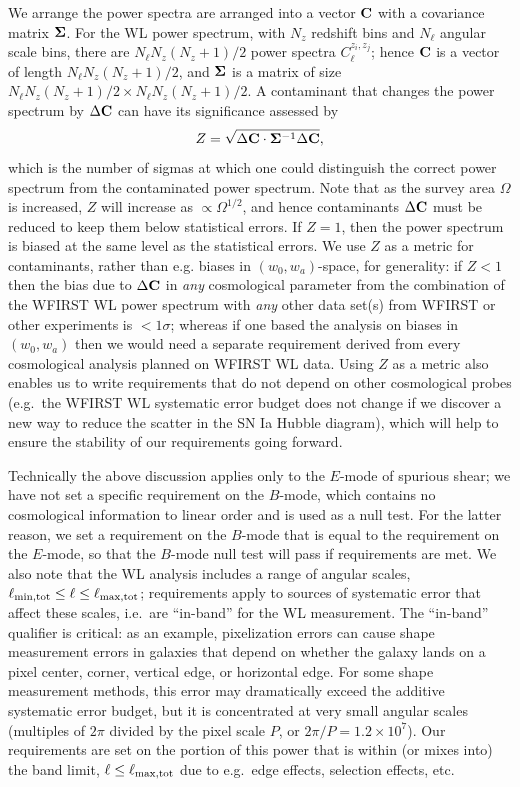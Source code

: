 \documentclass[aps,prd, amsmath,amssymb,superscriptaddress,showkeys,nofootinbib,reprint,preprintnumbers]{revtex4-1}
\begin{document}
We arrange the power spectra are arranged into a vector ${\bf C}$ with
a covariance matrix ${\bf\Sigma}$. For the WL power spectrum, with
$N_z$ redshift bins and $N_\ell$ angular scale bins, there are $N_\ell
N_z(N_z+1)/2$ power spectra $C_\ell^{z_i,z_j}$; hence ${\bf C}$ is a
vector of length $N_\ell N_z(N_z+1)/2$, and ${\bf\Sigma}$ is a matrix
of size $N_\ell N_z(N_z+1)/2 \times N_\ell N_z(N_z+1)/2$. A
contaminant that changes the power spectrum by $\Delta {\bf C}$ can
have its significance assessed by
\begin{equation}
Z = \sqrt{\Delta{\bf C}\cdot{\bf\Sigma}^{-1}\Delta{\bf C}},
\label{eq:alpha}
\end{equation}
which is the number of sigmas at which one could distinguish the
correct power spectrum from the contaminated power spectrum. Note that
as the survey area $\Omega$ is increased, $Z$ will increase as
$\propto\Omega^{1/2}$, and hence contaminants $\Delta{\bf C}$ must be
reduced to keep them below statistical errors. If $Z=1$, then the
power spectrum is biased at the same level as the statistical
errors. We use $Z$ as a metric for contaminants, rather than
e.g. biases in $(w_0,w_a)$-space, for generality: if $Z<1$ then the
bias due to $\Delta{\bf C}$ in {\em any} cosmological parameter from
the combination of the WFIRST WL power spectrum with {\em any} other
data set(s) from WFIRST or other experiments is $<1\sigma$; whereas if
one based the analysis on biases in $(w_0,w_a)$ then we would need a
separate requirement derived from every cosmological analysis planned
on WFIRST WL data. Using $Z$ as a metric also enables us to write
requirements that do not depend on other cosmological probes (e.g.\
the WFIRST WL systematic error budget does not change if we discover a
new way to reduce the scatter in the SN Ia Hubble diagram), which will
help to ensure the stability of our requirements going forward.

Technically the above discussion applies only to the $E$-mode of
spurious shear; we have not set a specific requirement on the
$B$-mode, which contains no cosmological information to linear order
and is used as a null test. For the latter reason, we set a
requirement on the $B$-mode that is equal to the requirement on the
$E$-mode, so that the $B$-mode null test will pass if requirements are
met. We also note that the WL analysis includes a range of angular
scales, $\ell_{\rm min,tot}\le \ell \le \ell_{\rm max,tot}$;
requirements apply to sources of systematic error that affect these
scales, i.e.\ are ``in-band'' for the WL measurement. The ``in-band''
qualifier is critical: as an example, pixelization errors can cause
shape measurement errors in galaxies that depend on whether the galaxy
lands on a pixel center, corner, vertical edge, or horizontal
edge. For some shape measurement methods, this error may dramatically
exceed the additive systematic error budget, but it is concentrated at
very small angular scales (multiples of $2\pi$ divided by the pixel
scale $P$, or $2\pi/P = 1.2\times 10^7$). Our requirements are set on
the portion of this power that is within (or mixes into) the band
limit, $\ell\le\ell_{\rm max,tot}$ due to e.g.\ edge effects,
selection effects, etc.
\end{document}
